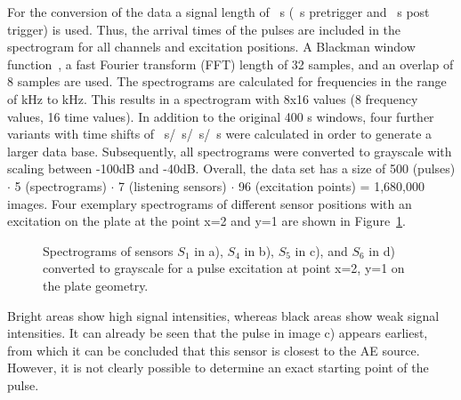 \documentclass{ieeeaccess}
\newlength\singlefigurewidth
\newlength\singlefigureheight
\newlength\figureheight
\newlength\figurewidth
\newcommand{\includetikz}[1]{%
	\tikzsetnextfilename{#1}%
}
\begin{document}
For the conversion of the data a signal length of \unit[400]{\textmu s} (\unit[75]{\textmu s} pretrigger and \unit[325]{\textmu s} post trigger) is used. Thus, the arrival times of the pulses are included in the spectrogram for all channels and excitation positions. A Blackman window function~\cite{blackman_window}, a fast Fourier transform (FFT) length of 32 samples, and an overlap of 8 samples are used. The spectrograms are calculated for frequencies in the range of \unit[100]{kHz} to \unit[500]{kHz}. This results in a spectrogram with 8x16 values (8 frequency values, 16 time values). In addition to the original 400 \textmu s windows, four further variants with time shifts of \unit[15]{\textmu s}/\unit[30]{\textmu s}/\unit[45]{\textmu s}/\unit[60]{\textmu s} were calculated in order to generate a larger data base. Subsequently, all spectrograms were converted to grayscale with scaling between -100dB and -40dB. Overall, the data set has a size of 500 (pulses) $\cdot$ 5 (spectrograms) $\cdot$ 7 (listening sensors) $\cdot$ 96 (excitation points) = 1,680,000 images. Four exemplary spectrograms of different sensor positions with an excitation on the plate at the point x=2 and y=1 are shown in Figure~\ref{fig:spectro_gray}. 

\begin{figure}[htb]
\setlength\figureheight{1.6\singlefigureheight}
\setlength\figurewidth{1\singlefigurewidth}
\centering
\includetikz{tikz/example2.tikz}
\caption{Spectrograms of sensors $S_1$ in a), $S_4$ in b), $S_5$ in c), and $S_6$ in d) converted to grayscale for a pulse excitation at point x=2, y=1 on the plate geometry.}
\label{fig:spectro_gray}
\end{figure}

Bright areas show high signal intensities, whereas black areas show weak signal intensities. It can already be seen that the pulse in image c) appears earliest, from which it can be concluded that this sensor is closest to the AE source. However, it is not clearly possible to determine an exact starting point of the pulse.



\end{document}
